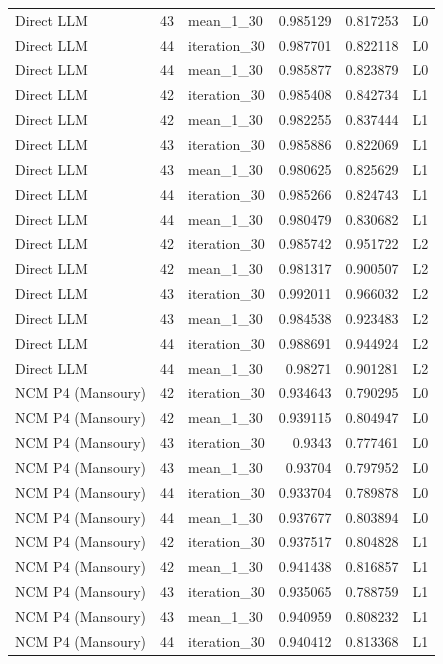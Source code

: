 \begin{table}[htbp!]
\begin{tabular}{lrlrrl}
Direct LLM & 43 & mean\_1\_30 & 0.985129 & 0.817253 & L0 \\
Direct LLM & 44 & iteration\_30 & 0.987701 & 0.822118 & L0 \\
Direct LLM & 44 & mean\_1\_30 & 0.985877 & 0.823879 & L0 \\
Direct LLM & 42 & iteration\_30 & 0.985408 & 0.842734 & L1 \\
Direct LLM & 42 & mean\_1\_30 & 0.982255 & 0.837444 & L1 \\
Direct LLM & 43 & iteration\_30 & 0.985886 & 0.822069 & L1 \\
Direct LLM & 43 & mean\_1\_30 & 0.980625 & 0.825629 & L1 \\
Direct LLM & 44 & iteration\_30 & 0.985266 & 0.824743 & L1 \\
Direct LLM & 44 & mean\_1\_30 & 0.980479 & 0.830682 & L1 \\
Direct LLM & 42 & iteration\_30 & 0.985742 & 0.951722 & L2 \\
Direct LLM & 42 & mean\_1\_30 & 0.981317 & 0.900507 & L2 \\
Direct LLM & 43 & iteration\_30 & 0.992011 & 0.966032 & L2 \\
Direct LLM & 43 & mean\_1\_30 & 0.984538 & 0.923483 & L2 \\
Direct LLM & 44 & iteration\_30 & 0.988691 & 0.944924 & L2 \\
Direct LLM & 44 & mean\_1\_30 & 0.98271 & 0.901281 & L2 \\
NCM P4 (Mansoury) & 42 & iteration\_30 & 0.934643 & 0.790295 & L0 \\
NCM P4 (Mansoury) & 42 & mean\_1\_30 & 0.939115 & 0.804947 & L0 \\
NCM P4 (Mansoury) & 43 & iteration\_30 & 0.9343 & 0.777461 & L0 \\
NCM P4 (Mansoury) & 43 & mean\_1\_30 & 0.93704 & 0.797952 & L0 \\
NCM P4 (Mansoury) & 44 & iteration\_30 & 0.933704 & 0.789878 & L0 \\
NCM P4 (Mansoury) & 44 & mean\_1\_30 & 0.937677 & 0.803894 & L0 \\
NCM P4 (Mansoury) & 42 & iteration\_30 & 0.937517 & 0.804828 & L1 \\
NCM P4 (Mansoury) & 42 & mean\_1\_30 & 0.941438 & 0.816857 & L1 \\
NCM P4 (Mansoury) & 43 & iteration\_30 & 0.935065 & 0.788759 & L1 \\
NCM P4 (Mansoury) & 43 & mean\_1\_30 & 0.940959 & 0.808232 & L1 \\
NCM P4 (Mansoury) & 44 & iteration\_30 & 0.940412 & 0.813368 & L1 \\

\end{tabular}
\end{table}
